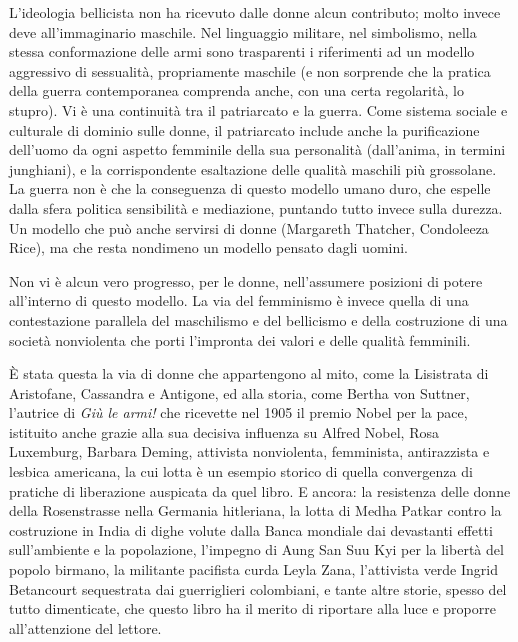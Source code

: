 \documentclass[12pt,oneside,openany]{book}
\begin{document}
L'ideologia bellicista non ha ricevuto dalle donne alcun contributo; molto invece deve all'immaginario maschile. Nel linguaggio militare, nel simbolismo, nella stessa conformazione delle armi sono trasparenti i riferimenti ad un modello aggressivo di sessualità, propriamente maschile (e non sorprende che la pratica della guerra contemporanea comprenda anche, con una certa regolarità, lo stupro). Vi è una continuità tra il patriarcato e la guerra. Come sistema sociale e culturale di dominio sulle donne, il patriarcato include anche la purificazione dell'uomo da ogni aspetto femminile della sua personalità (dall'anima, in termini junghiani), e la corrispondente esaltazione delle qualità maschili più grossolane. La guerra non è che la conseguenza di questo modello umano duro, che espelle dalla sfera politica sensibilità e mediazione, puntando tutto invece sulla durezza. Un modello che può anche servirsi di donne (Margareth Thatcher, Condoleeza Rice), ma che resta nondimeno un modello pensato dagli uomini.



Non vi è alcun vero progresso, per le donne, nell'assumere posizioni di potere all'interno di questo modello. La via del femminismo è invece quella di una contestazione parallela del maschilismo e del bellicismo e della costruzione di una società nonviolenta che porti l'impronta dei valori e delle qualità femminili.



È stata questa la via di donne che appartengono al mito, come la Lisistrata di Aristofane, Cassandra e Antigone, ed alla storia, come Bertha von Suttner, l'autrice di \emph{Giù le armi!} che ricevette nel 1905 il premio Nobel per la pace, istituito anche grazie alla sua decisiva influenza su Alfred Nobel, Rosa Luxemburg, Barbara Deming, attivista nonviolenta, femminista, antirazzista e lesbica americana, la cui lotta è un esempio storico di quella convergenza di pratiche di liberazione auspicata da quel libro. E ancora: la resistenza delle donne della Rosenstrasse nella Germania hitleriana, la lotta di Medha Patkar contro la costruzione in India di dighe volute dalla Banca mondiale dai devastanti effetti sull'ambiente e la popolazione, l'impegno di Aung San Suu Kyi per la libertà del popolo birmano, la militante pacifista curda Leyla Zana, l'attivista verde Ingrid Betancourt sequestrata dai guerriglieri colombiani, e tante altre storie, spesso del tutto dimenticate, che questo libro ha il merito di riportare alla luce e proporre all'attenzione del lettore.
\end{document}
